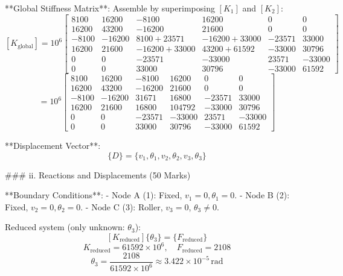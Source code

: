 **Global Stiffness Matrix**:
Assemble by superimposing \( [K_1] \) and \( [K_2] \):
\[
[K_{\text{global}}] = 10^6 \begin{bmatrix}
8100 & 16200 & -8100 & 16200 & 0 & 0 \\
16200 & 43200 & -16200 & 21600 & 0 & 0 \\
-8100 & -16200 & 8100 + 23571 & -16200 + 33000 & -23571 & 33000 \\
16200 & 21600 & -16200 + 33000 & 43200 + 61592 & -33000 & 30796 \\
0 & 0 & -23571 & -33000 & 23571 & -33000 \\
0 & 0 & 33000 & 30796 & -33000 & 61592
\end{bmatrix}
\]
\[
= 10^6 \begin{bmatrix}
8100 & 16200 & -8100 & 16200 & 0 & 0 \\
16200 & 43200 & -16200 & 21600 & 0 & 0 \\
-8100 & -16200 & 31671 & 16800 & -23571 & 33000 \\
16200 & 21600 & 16800 & 104792 & -33000 & 30796 \\
0 & 0 & -23571 & -33000 & 23571 & -33000 \\
0 & 0 & 33000 & 30796 & -33000 & 61592
\end{bmatrix}
\]

**Displacement Vector**:
\[
\{ D \} = \{ v_1, \theta_1, v_2, \theta_2, v_3, \theta_3 \}
\]

### ii. Reactions and Displacements (50 Marks)

**Boundary Conditions**:
- Node A (1): Fixed, \( v_1 = 0, \theta_1 = 0 \).
- Node B (2): Fixed, \( v_2 = 0, \theta_2 = 0 \).
- Node C (3): Roller, \( v_3 = 0 \), \( \theta_3 \neq 0 \).

Reduced system (only unknown: \( \theta_3 \)):
\[
[K_{\text{reduced}}] \{ \theta_3 \} = \{ F_{\text{reduced}} \}
\]
\[
K_{\text{reduced}} = 61592 \times 10^6, \quad F_{\text{reduced}} = 2108
\]
\[
\theta_3 = \frac{2108}{61592 \times 10^6} \approx 3.422 \times 10^{-5} \, \text{rad}
\]

